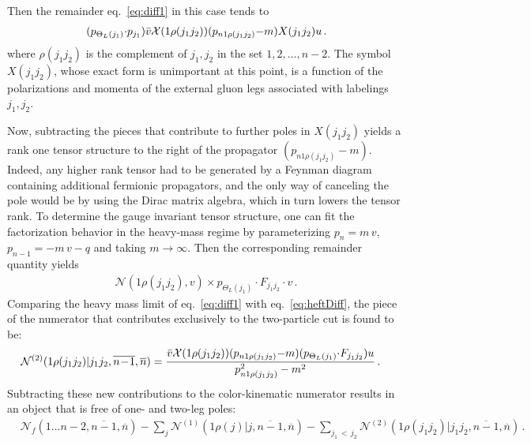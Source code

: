 \documentclass[a4paper,12pt]{article}
\makeatletter
\def\sc#1{\overline{#1}}
\newcommand{\npre}{\mathcal{N}}
\newcommand{\mdot}{{\cdot}}
\newcommand*{\bigcdot}{}%
\DeclareRobustCommand*{\bigcdot}{%
  \mathbin{\mathpalette\bigcdot@{}}%
}
\newcommand*{\bigcdot@scalefactor}{.6}
\newcommand*{\bigcdot@widthfactor}{1.25}
\newcommand*{\bigcdot@}[2]{%
  \sbox0{$#1\vcenter{}$}%
  \sbox2{$#1\cdot\m@th$}%
  \hbox to \bigcdot@widthfactor\wd2{%
    \hfil
    \raise\ht0\hbox{%
      \scalebox{\bigcdot@scalefactor}{%
        \lower\ht0\hbox{$#1\bullet\m@th$}%
      }%
    }%
    \hfil
  }%
}
\newcommand{\dd}{\bigcdot}
\makeatother
\begin{document}
 Then the remainder  eq.~\eqref{eq:diff1} in this case tends to 
\begin{align}\label{factorisation two legs}
    (p_{\Theta_L(j_1)}\mdot p_{j_1}) \bar v \dd {\cal X}(1\rho{(j_1j_2)})\dd (p_{n1\rho{(j_1j_2)}}{-}m) \dd X(j_1 j_2) \dd u \, .
\end{align}
where $\rho(j_1j_2)$ is the complement of $j_1,j_2$ in the set $1,2,\ldots, n-2$. The symbol $X(j_1 j_2)$, whose exact form is unimportant at this point, is a function of the polarizations and momenta of the external gluon legs associated with labelings $j_1,j_2$. 

Now, subtracting the pieces that contribute to further poles in $X(j_1j_2)$ yields a rank one tensor structure to the right of the propagator $(p_{n1 \rho{(j_1j_2)} }{-}m)$. Indeed, any higher rank tensor had to be generated by a Feynman diagram containing additional fermionic propagators, and the only way of canceling the pole would be by using the Dirac matrix algebra, which in turn lowers the tensor rank. To determine the gauge invariant tensor structure, one can fit the factorization behavior in the heavy-mass regime by parameterizing $p_n=m\, v$, $p_{n\!-\!1} = -m\, v - q$ and taking $m\to\infty$. Then the corresponding remainder quantity yields \cite{Brandhuber:2021bsf}
%
\begin{align}\label{eq:heftDiff}
    \npre(1\rho{(j_1j_2)},v)\times p_{\Theta_L(j_1)}\mdot F_{j_1j_2}\mdot v \, .
\end{align}
%
Comparing the heavy mass limit of  eq.~\eqref{eq:diff1} with  eq.~\eqref{eq:heftDiff}, the piece of the numerator that contributes exclusively to the two-particle cut is found to be:
%
\begin{align}
     &\npre^{(2)}(1\rho{(j_1j_2)} |j_1 j_2, \sc {n\!-\!1},\sc n)= { \bar v \dd {\cal X}(1\rho{(j_1j_2)})\dd (p_{n1\rho{(j_1j_2)}}{-}m)\dd (p_{\Theta_L(j_1)}\mdot F_{j_1j_2})\dd u \over p^2_{n1\rho{(j_1j_2)}}-m^2} \, .
\end{align}
%
Subtracting these new contributions to the color-kinematic numerator results in an object that is free of one- and two-leg poles:
%
\begin{align}
    &\npre_f(1\ldots n\!-\!2, \sc {n\!-\!1},\sc n)-\sum_{j} \npre^{(1)}(1\rho{(j)}|j, \sc {n\!-\!1},\sc n)-\sum_{j_1\,<\,j_2} \npre^{(2)}(1\rho{(j_1j_2)}|j_1 j_2, \sc {n\!-\!1},\sc n) \, .
\end{align}
%
\end{document}
